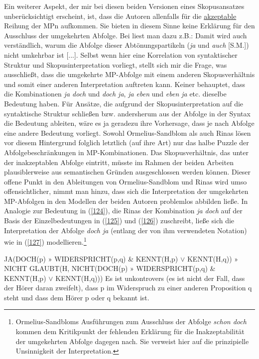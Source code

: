 \noindent
Ein weiterer Aspekt, der mir bei diesen beiden Versionen eines Skopusansatzes unberücksichtigt erscheint, ist, dass die Autoren allenfalls für die \underline{akzeptable} Reihung der MPn aufkommen. Sie bieten in diesem Sinne keine Erklärung für den Ausschluss der umgekehrten Abfolge. Bei \citet[425 bzw. 434]{Rinas2007} liest man dazu z.B.: \glqq Damit wird auch verständlich, warum die Abfolge dieser Abtönungspartikeln (\textit{ja} und \textit{auch} [S.M.]) nicht umkehrbar ist [...].\grqq{} Selbst wenn hier eine Korrelation von syntaktischer Struktur und Skopusinterpretation vorliegt, stellt sich mir die Frage, was ausschließt, dass die umgekehrte MP-Abfolge mit einem anderen Skopusverhältnis und somit einer anderen Interpretation auftreten kann. Keiner behauptet, dass die Kombinationen \textit{ja doch} und \textit{doch ja}, \textit{ja eben} und \textit{eben ja} etc. dieselbe Bedeutung haben. Für Ansätze, die aufgrund der Skopusinterpretation auf die syntaktische Struktur schließen bzw. andersherum aus der Abfolge in der Syntax die Bedeutung ableiten, wäre es ja geradezu ihre Vorhersage, dass je nach Abfolge eine andere Bedeutung vorliegt. Sowohl Ormelius-Sandblom als auch Rinas lösen vor diesem Hintergrund folglich letztlich (auf ihre Art) nur das halbe Puzzle der Abfolgebeschränkungen in MP-Kombinationen. Das Skopusverhältnis,  das unter der inakzeptablen Abfolge eintritt, müsste im Rahmen der beiden Arbeiten plausiblerweise aus semantischen Gründen ausgeschlossen werden können. Dieser offene Punkt in den Ableitungen von Orme\-lius-Sandblom und Rinas wird umso offensichtlicher, nimmt man hinzu, dass sich die Interpretation der umgekehrten MP-Abfolgen in den Modellen der beiden Autoren problemlos abbilden ließe. In Analogie zur Bedeutung in (\ref{124}), die Rinas der Kombination \textit{ja doch} auf der Basis der Einzelbedeutungen in (\ref{125}) und (\ref{126}) zuschreibt, ließe sich die Interpretation der Abfolge \textit{doch ja} (entlang der von ihm verwendeten Notation) wie in (\ref{127}) modellieren.\footnote{Ormelius-Sandbloms Ausführungen zum Ausschluss der Abfolge \textit{schon doch} kommen dem Kritikpunkt der fehlenden Erklärung für die Inakzeptabilität der umgekehrten Abfolge dagegen nach. Sie verweist hier auf die prinzipielle Unsinnigkeit der Interpretation.}

\begin{exe}
	\ex\label{124} 
		\begin{xlist}	
			\ex\label{124a} JA(DOCH(p) $»$ WIDERSPRICHT(p,q) \& KENNT(H,p) $\lor$ KENNT(H,q))
				$»$ NICHT GLAUBT(H, NICHT(DOCH(p) $»$ WIDERSPRICHT(p,q) \& KENNT(H,p) $\lor$ KENNT(H,q)))
			\ex\label{124b} \glq Es ist unkontrovers (es ist nicht der Fall, dass der Hörer daran zweifelt), dass p im Widerspruch zu einer anderen Proposition q steht und dass dem Hörer p oder q bekannt ist.\grq {}
			\hfill\hbox {\citet[431]{Rinas2007}}
		\end{xlist}
\end{exe}

